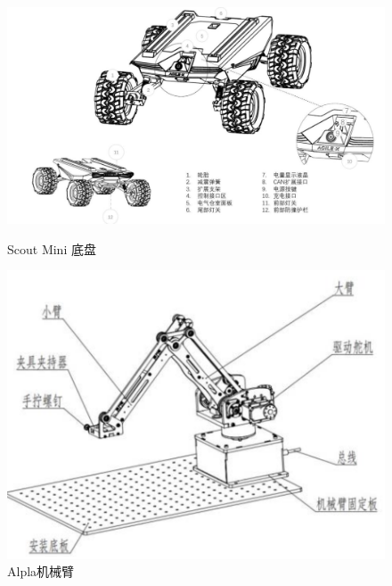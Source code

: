 \documentclass[a4paper,twoside]{article}
\begin{document}
\begin{figure}[htbp]
	\centering
	\begin{minipage}{0.49\linewidth}
		\centering
		\includegraphics[width=1.0\linewidth]{scoutmini.png}
		\caption{Scout Mini 底盘}
	\end{minipage}
	\begin{minipage}{0.49\linewidth}
		\centering
		\includegraphics[width=0.9\linewidth]{alpha.png}
		\caption{Alpla机械臂}
	\end{minipage}
\end{figure}
\newpage
\end{document}
